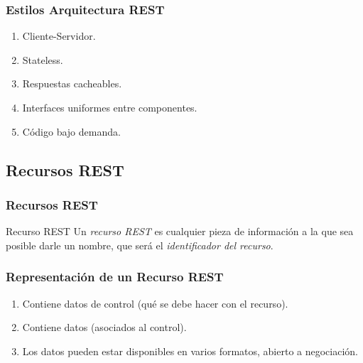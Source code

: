 \documentclass[a4paper,slidestop,xcolor=pst,blue]{beamer}
\begin{document}
\begin{frame}[c]
	\frametitle{Estilos Arquitectura REST}
    \begin{enumerate}[<+->]
        \item Cliente-Servidor.
        \item Stateless.
        \item Respuestas cacheables.
        \item Interfaces uniformes entre componentes.
        \item Código bajo demanda.
    \end{enumerate}
\end{frame}

\subsection{Recursos REST}

\begin{frame}[c]
	\frametitle{Recursos REST}
    \begin{block}{Recurso REST}
        Un \emph{recurso REST} es cualquier pieza de información a la que sea posible darle un nombre, que será el \emph{identificador del recurso}.
    \end{block}
\end{frame}

\begin{frame}[c]
	\frametitle{Representación de un Recurso REST}
    \begin{enumerate}
        \item Contiene datos de control (qué se debe hacer con el recurso).
        \item Contiene datos (asociados al control).
        \item Los datos pueden estar disponibles en varios formatos, abierto a negociación.
    \end{enumerate}
\end{frame}
\end{document}
